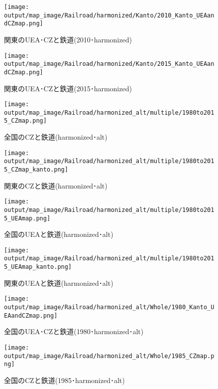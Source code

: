 \documentclass{ltjsarticle}
\begin{document}
\begin{figure}[pbth]
  \centering
  \texttt{[image: output/map\_image/Railroad/harmonized/Kanto/2010\_Kanto\_UEAandCZmap.png]}
  \caption{\label{ham:2010:KanCZandUEA:Rail}関東のUEA･CZと鉄道(2010･harmonized)}
\end{figure}


\begin{figure}[pbth]
  \centering
  \texttt{[image: output/map\_image/Railroad/harmonized/Kanto/2015\_Kanto\_UEAandCZmap.png]}
  \caption{\label{ham:2015:KanCZandUEA:Rail}関東のUEA･CZと鉄道(2015･harmonized)}
\end{figure}


\begin{figure}[pbth]
  \centering
  \texttt{[image: output/map\_image/Railroad/harmonized\_alt/multiple/1980to2015\_CZmap.png]}
  \caption{\label{altham:allCZandRail}全国のCZと鉄道(harmonized･alt)}
\end{figure}

\begin{figure}[pbth]
  \centering
  \texttt{[image: output/map\_image/Railroad/harmonized\_alt/multiple/1980to2015\_CZmap\_kanto.png]}
  \caption{\label{altham:KanCZandRail}関東のCZと鉄道(harmonized･alt)}
\end{figure}


\begin{figure}[pbth]
  \centering
  \texttt{[image: output/map\_image/Railroad/harmonized\_alt/multiple/1980to2015\_UEAmap.png]}
  \caption{\label{altham:allUEAandRail}全国のUEAと鉄道(harmonized･alt)}
\end{figure}


\begin{figure}[pbth]
  \centering
  \texttt{[image: output/map\_image/Railroad/harmonized\_alt/multiple/1980to2015\_UEAmap\_kanto.png]}
  \caption{\label{altham:KanUEAandRail}関東のUEAと鉄道(harmonized･alt)}
\end{figure}


\begin{figure}[pbth]
  \centering
  \texttt{[image: output/map\_image/Railroad/harmonized\_alt/Whole/1980\_Kanto\_UEAandCZmap.png]}
  \caption{\label{altham:1980:allCZandUEA:Rail}全国のUEA･CZと鉄道(1980･harmonized･alt)}
\end{figure}


\begin{figure}[pbth]
  \centering
  \texttt{[image: output/map\_image/Railroad/harmonized\_alt/Whole/1985\_CZmap.png]}
  \caption{\label{altham:1985:allCZandUEA:Rail}全国のCZと鉄道(1985･harmonized･alt)}
\end{figure}
\end{document}
